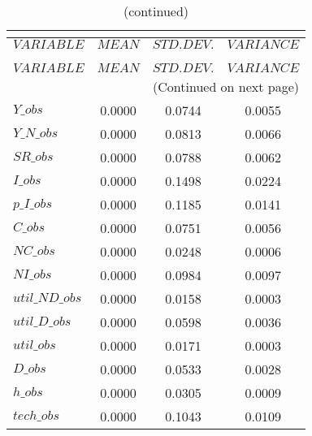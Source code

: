  
\begin{center}
\begin{longtable}{lccc} 
\caption{THEORETICAL MOMENTS}\\
 \label{Table:th_moments}\\
\toprule 
$VARIABLE       $	 & 	 $         MEAN$	 & 	 $    STD. DEV.$	 & 	 $     VARIANCE$\\
\midrule \endfirsthead 
\caption{(continued)}\\
 \toprule \\ 
$VARIABLE       $	 & 	 $         MEAN$	 & 	 $    STD. DEV.$	 & 	 $     VARIANCE$\\
\midrule \endhead 
\midrule \multicolumn{4}{r}{(Continued on next page)} \\ \bottomrule \endfoot 
\bottomrule \endlastfoot 
$Y\_obs         $	 & 	       0.0000	 & 	       0.0744	 & 	       0.0055 \\ 
$Y\_N\_obs      $	 & 	       0.0000	 & 	       0.0813	 & 	       0.0066 \\ 
$SR\_obs        $	 & 	       0.0000	 & 	       0.0788	 & 	       0.0062 \\ 
$I\_obs         $	 & 	       0.0000	 & 	       0.1498	 & 	       0.0224 \\ 
$p\_I\_obs      $	 & 	       0.0000	 & 	       0.1185	 & 	       0.0141 \\ 
$C\_obs         $	 & 	       0.0000	 & 	       0.0751	 & 	       0.0056 \\ 
$NC\_obs        $	 & 	       0.0000	 & 	       0.0248	 & 	       0.0006 \\ 
$NI\_obs        $	 & 	       0.0000	 & 	       0.0984	 & 	       0.0097 \\ 
$util\_ND\_obs  $	 & 	       0.0000	 & 	       0.0158	 & 	       0.0003 \\ 
$util\_D\_obs   $	 & 	       0.0000	 & 	       0.0598	 & 	       0.0036 \\ 
$util\_obs      $	 & 	       0.0000	 & 	       0.0171	 & 	       0.0003 \\ 
$D\_obs         $	 & 	       0.0000	 & 	       0.0533	 & 	       0.0028 \\ 
$h\_obs         $	 & 	       0.0000	 & 	       0.0305	 & 	       0.0009 \\ 
$tech\_obs      $	 & 	       0.0000	 & 	       0.1043	 & 	       0.0109 \\ 
\end{longtable}
 \end{center}

